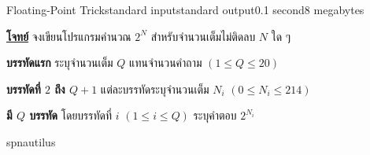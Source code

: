 \documentclass[11pt,a4paper]{article}
\begin{document}
\begin{problem}{Floating-Point Trick}{standard input}{standard output}{0.1 second}{8 megabytes}


\underline{\textbf{โจทย์}} จงเขียนโปรแกรมคำนวณ $2^N$ สำหรับจำนวนเต็มไม่ติดลบ $N$ ใด ๆ

\InputFile
\textbf{บรรทัดแรก} ระบุจำนวนเต็ม $Q$ แทนจำนวนคำถาม $(1 \leq Q \leq 20)$

\textbf{บรรทัดที่ $2$ ถึง $Q+1$} แต่ละบรรทัดระบุจำนวนเต็ม $N_i$ $(0 \leq N_i \leq 214)$

\OutputFile

\textbf{มี $Q$ บรรทัด} โดยบรรทัดที่ $i$ $(1 \leq i \leq Q)$ ระบุคำตอบ $2^{N_i}$

\Examples

\begin{example}
%
\end{example}

\Source

spnautilus

\end{problem}
\end{document}

